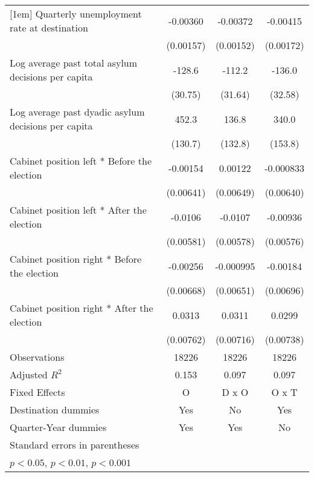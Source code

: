 \begin{table}[htbp]
\begin{tabular}{l*{3}{c}}
[1em]
Quarterly unemployment rate at destination&    -0.00360\sym{*}  &    -0.00372\sym{*}  &    -0.00415\sym{*}  \\
                    &   (0.00157)         &   (0.00152)         &   (0.00172)         \\
[1em]
Log average past total asylum decisions per capita&      -128.6\sym{***}&      -112.2\sym{***}&      -136.0\sym{***}\\
                    &     (30.75)         &     (31.64)         &     (32.58)         \\
[1em]
Log average past dyadic asylum decisions per capita&       452.3\sym{**} &       136.8         &       340.0\sym{*}  \\
                    &     (130.7)         &     (132.8)         &     (153.8)         \\
[1em]
Cabinet position left * Before the election&    -0.00154         &     0.00122         &   -0.000833         \\
                    &   (0.00641)         &   (0.00649)         &   (0.00640)         \\
[1em]
Cabinet position left * After the election&     -0.0106         &     -0.0107         &    -0.00936         \\
                    &   (0.00581)         &   (0.00578)         &   (0.00576)         \\
[1em]
Cabinet position right * Before the election&    -0.00256         &   -0.000995         &    -0.00184         \\
                    &   (0.00668)         &   (0.00651)         &   (0.00696)         \\
[1em]
Cabinet position right * After the election&      0.0313\sym{***}&      0.0311\sym{***}&      0.0299\sym{***}\\
                    &   (0.00762)         &   (0.00716)         &   (0.00738)         \\
\hline
Observations        &       18226         &       18226         &       18226         \\
Adjusted \(R^{2}\)  &       0.153         &       0.097         &       0.097         \\
Fixed Effects       &           O         &       D x O         &       O x T         \\
Destination dummies &         Yes         &          No         &         Yes         \\
Quarter-Year dummies&         Yes         &         Yes         &          No         \\
\hline\hline
\multicolumn{4}{l}{\footnotesize Standard errors in parentheses}\\
\multicolumn{4}{l}{\footnotesize \sym{*} \(p<0.05\), \sym{**} \(p<0.01\), \sym{***} \(p<0.001\)}\\
\end{tabular}
\end{table}

